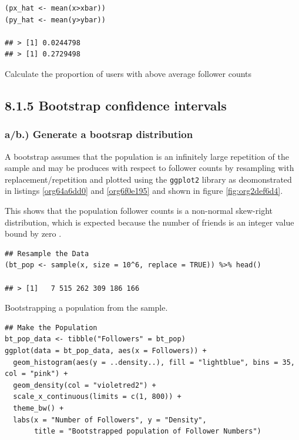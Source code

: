 \documentclass[11pt]{article}
\begin{document}
\begin{listing}[htbp]
\begin{verbatim}
(px_hat <- mean(x>xbar))
(py_hat <- mean(y>ybar))

## > [1] 0.0244798
## > [1] 0.2729498
\end{verbatim}
\caption{\label{orgab4b653}Calculate the proportion of users with above average follower counts}
\end{listing}


\subsection{8.1.5 Bootstrap confidence intervals}
\label{sec:org0cf50bd}
\subsubsection{a/b.) Generate a bootsrap distribution}
\label{sec:orgbe0ade8}

A bootstrap assumes that the population is an infinitely large repetition of the
sample and may be produces with respect to follower counts by resampling with
replacement/repetition and plotted using the \texttt{ggplot2} library as deomonstrated
in listings \ref{org64a6dd0} and \ref{org6f0e195} and shown in figure \ref{fig:org2def6d4}.

This shows that the population follower counts is a non-normal skew-right
distribution, which is expected because the number of friends is an integer value bound by zero \cite{nist2013}.

\begin{listing}[htbp]
\begin{verbatim}
## Resample the Data
(bt_pop <- sample(x, size = 10^6, replace = TRUE)) %>% head()

## > [1]   7 515 262 309 186 166
\end{verbatim}
\caption{\label{org64a6dd0}Bootstrapping a population from the sample.}
\end{listing}

\begin{listing}[htbp]
\begin{verbatim}
## Make the Population
bt_pop_data <- tibble("Followers" = bt_pop)
ggplot(data = bt_pop_data, aes(x = Followers)) +
  geom_histogram(aes(y = ..density..), fill = "lightblue", bins = 35, col = "pink") +
  geom_density(col = "violetred2") +
  scale_x_continuous(limits = c(1, 800)) +
  theme_bw() +
  labs(x = "Number of Followers", y = "Density",
       title = "Bootstrapped population of Follower Numbers")

\end{verbatim}
\label{org6f0e195}
\end{listing}
\end{document}
